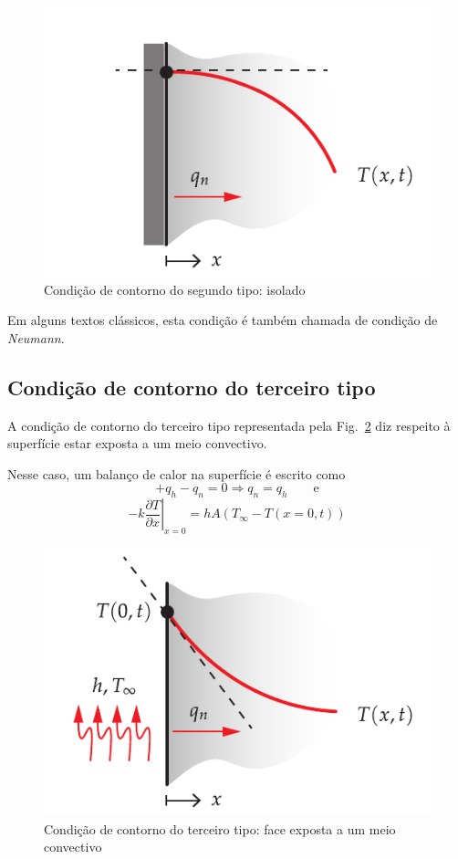 \begin{figure}[H]
	\centering
	\includegraphics[scale=1]{figuras/cap1/ccAdiabatica}
	\caption{Condição de contorno do segundo tipo: isolado}
	\label{fig:ccIsolado}
\end{figure}

Em alguns textos clássicos, esta condição é também chamada de condição de \textit{Neumann}.

\subsection{Condição de contorno do terceiro tipo}
A condição de contorno do terceiro tipo representada pela Fig.~\ref{fig:ccConveccao} diz respeito à superfície estar exposta a um meio convectivo. 

Nesse caso, um balanço de calor na superfície é escrito como
\begin{equation}\label{eq:q5}
+ q_h - q_n = 0 \Rightarrow q_n = q_h \qquad \text{e}
\end{equation}
\begin{equation}\label{eq:q6}
	-k\left.{\frac{\partial{T}}{\partial{x}}}\right|_{x=0} 
	= h A (T_{\infty} - T(x=0,t))
\end{equation}

\begin{figure}[H]
	\centering
	\includegraphics[scale=1]{figuras/cap1/ccConveccao}
	\caption{Condição de contorno do terceiro tipo: face exposta a um meio convectivo}
	\label{fig:ccConveccao}
\end{figure}

